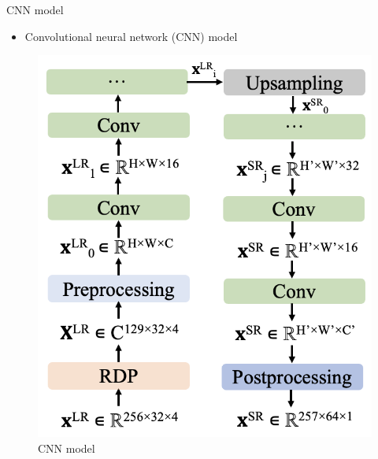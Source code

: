 \documentclass{beamer}
\begin{document}
\begin{frame}[t]{CNN model}
    \begin{itemize}
        \item Convolutional neural network (CNN) model
    \end{itemize}
    \begin{figure}
        \centering
        \includegraphics[scale=.46]{MA_presentation/figures/cnn_simple.png}
        \caption{CNN model}
    \end{figure}

\end{frame}
\end{document}
